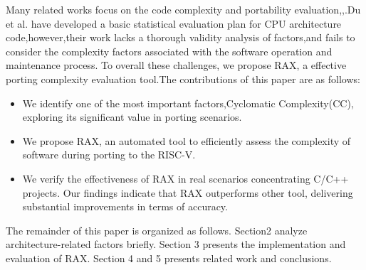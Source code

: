 \documentclass[sigconf,screen,review,anonymous]{acmart}
\begin{document}
Many related works focus on the code complexity and portability evaluation\cite{2016helei},\cite{TAHIR2016101},\cite{Sholiq_2021}.Du et al. have developed a basic statistical evaluation plan for CPU architecture code\citep{2023du},however,their work lacks a thorough validity analysis of factors,and fails to consider the complexity factors associated with the software operation and maintenance process.
To overall these challenges, we propose RAX, a effective porting
complexity evaluation tool.The contributions of this paper are as follows:
\begin{itemize}
  \item We identify one of the most important factors,Cyclomatic Complexity(CC), exploring its significant value in porting scenarios.
  \item We propose RAX, an automated tool to efficiently assess the complexity of software during porting to the RISC-V.
  \item We verify the effectiveness of RAX in real scenarios concentrating C/C++ projects. Our findings indicate that RAX outperforms other tool, delivering substantial improvements in terms of accuracy.
\end{itemize}

The remainder of this paper is organized as follows. Section2 analyze architecture-related factors briefly. Section 3 presents the implementation and evaluation of RAX. Section 4 and 5 presents related work and conclusions.


\end{document}
